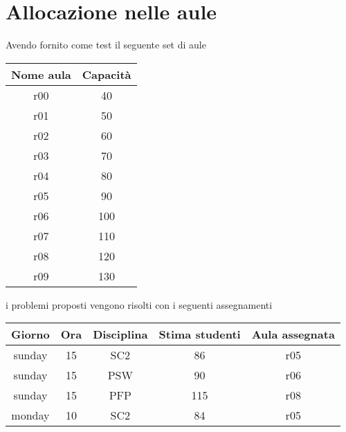 \newpage

\section{Allocazione nelle aule}
\label{section:results_mp}

Avendo fornito come test il seguente set di aule

\begin{table}[h]
    \begin{small}
        \begin{center}
            \begin{tabular}[c]{c|c}
                Nome aula & Capacità \\
                \hline
                r00 & 40 \\
                r01 & 50 \\
                r02 & 60 \\
                r03 & 70 \\
                r04 & 80 \\
                r05 & 90 \\
                r06 & 100 \\
                r07 & 110 \\
                r08 & 120 \\
                r09 & 130 
            \end{tabular}
        \end{center}
    \end{small}
\end{table}

\noindent
i problemi proposti vengono risolti con i seguenti assegnamenti

\begin{table}[h]
    \begin{small}
        \begin{center}
            \begin{tabular}[c]{c|c|c|c|c}
                Giorno & Ora & Disciplina & Stima studenti & Aula assegnata \\
                \hline
                sunday & 15 & SC2 & 86 & r05 \\
                sunday & 15 & PSW & 90 & r06 \\
                sunday & 15 & PFP & 115 & r08 \\
                monday & 10 & SC2 & 84 & r05
            \end{tabular}
        \end{center}
    \end{small}
\end{table}

